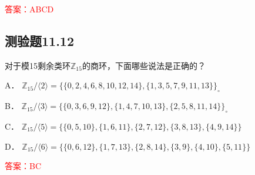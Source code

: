 \documentclass[UTF8, heading=true]{ctexart}
\begin{document}
\textcolor{red}{答案：ABCD}


\subsection{测验题11.12}

对于模15剩余类环$\mathbb{Z}_{15}$的商环，下面哪些说法是正确的？

A．
$
\mathbb{Z}_{15} /\langle 2\rangle=\{\{0,2,4,6,8,10,12,14\},\{1,3,5,7,9,11,13\}\}_{\circ}
$


B．
$
\mathbb{Z}_{15} /\langle 3\rangle=\{\{0,3,6,9,12\},\{1,4,7,10,13\},\{2,5,8,11,14\}\}_{\circ}
$


C．
$
\mathbb{Z}_{15} /\langle 5\rangle=\{\{0,5,10\},\{1,6,11\},\{2,7,12\},\{3,8,13\},\{4,9,14\}\}
$


D．
$
\mathbb{Z}_{15} /\langle 6\rangle=\{\{0,6,12\},\{1,7,13\},\{2,8,14\},\{3,9\},\{4,10\},\{5,11\}\}
$

\textcolor{red}{答案：BC}
\end{document}
